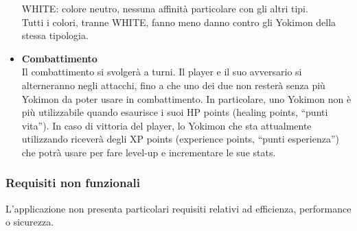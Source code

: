 \documentclass[a4paper,12pt]{report}
\begin{document}
\begin{itemize}
    WHITE: colore neutro, nessuna affinità particolare con gli altri tipi. \\
    Tutti i colori, tranne WHITE, fanno meno danno contro gli Yokimon della stessa tipologia.
    \item \textbf{Combattimento} \\
    Il combattimento si svolgerà a turni.
    Il player e il suo avversario si alterneranno negli attacchi, fino a che uno dei due non resterà senza più Yokimon da poter usare in combattimento. In particolare, uno Yokimon non è più utilizzabile quando esaurisce i suoi HP points (healing points, “punti vita”).
    In caso di vittoria del player, lo Yokimon che sta attualmente utilizzando riceverà degli XP points (experience points, “punti esperienza”) che potrà usare per fare level-up e incrementare le sue stats.
\end{itemize}
\subsubsection{Requisiti non funzionali}
L’applicazione non presenta particolari requisiti relativi ad efficienza, performance o sicurezza.
\end{document}
